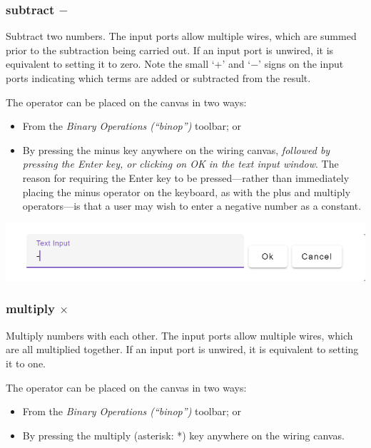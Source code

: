 \subsubsection{subtract $-$}


\label{Operation:subtract} Subtract two numbers. The input ports
allow multiple wires, which are summed prior to the subtraction being
carried out. If an input port is unwired, it is equivalent to setting
it to zero. Note the small `+' and `$-$' signs on the input ports
indicating which terms are added or subtracted from the result.


The operator can be placed on the canvas in two ways:
\begin{itemize}
\item From the \emph{Binary Operations (``binop'')} toolbar; or 
\item By pressing the minus key anywhere on the wiring canvas, \textit{followed
by pressing the Enter key, or clicking on OK in the text input window}.
The reason for requiring the Enter key to be pressed---rather than
immediately placing the minus operator on the keyboard, as with the
plus and multiply operators---is that a user may wish to enter a
negative number as a constant. 
\end{itemize}

\noindent\includegraphics[width=\textwidth]{images/MinusTextWindow}

\subsubsection{multiply $\times$}


\label{Operation:multiply} Multiply numbers with each other. The
input ports allow multiple wires, which are all multiplied together.
If an input port is unwired, it is equivalent to setting it to one.


The operator can be placed on the canvas in two ways:
\begin{itemize}
\item From the \emph{Binary Operations (``binop'')} toolbar; or 
\item By pressing the multiply (asterisk: {*}) key anywhere on the wiring
canvas. 
\end{itemize}

